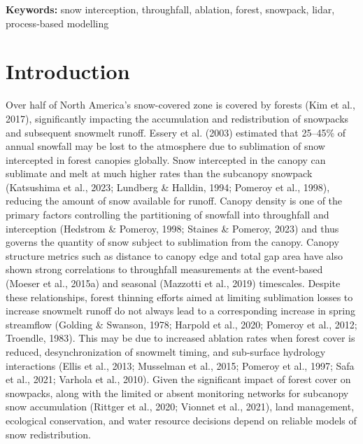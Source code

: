 \documentclass[
  letterpaper,
  DIV=11,
  numbers=noendperiod]{scrartcl}
\begin{document}
\textbf{Keywords:} snow interception, throughfall, ablation, forest,
snowpack, lidar, process-based modelling

\section{Introduction}\label{introduction}

Over half of North America's snow-covered zone is covered by forests
(Kim et al., 2017), significantly impacting the accumulation and
redistribution of snowpacks and subsequent snowmelt runoff. Essery et
al. (2003) estimated that 25--45\% of annual snowfall may be lost to the
atmosphere due to sublimation of snow intercepted in forest canopies
globally. Snow intercepted in the canopy can sublimate and melt at much
higher rates than the subcanopy snowpack (Katsushima et al., 2023;
Lundberg \& Halldin, 1994; Pomeroy et al., 1998), reducing the amount of
snow available for runoff. Canopy density is one of the primary factors
controlling the partitioning of snowfall into throughfall and
interception (Hedstrom \& Pomeroy, 1998; Staines \& Pomeroy, 2023) and
thus governs the quantity of snow subject to sublimation from the
canopy. Canopy structure metrics such as distance to canopy edge and
total gap area have also shown strong correlations to throughfall
measurements at the event-based (Moeser et al., 2015a) and seasonal
(Mazzotti et al., 2019) timescales. Despite these relationships, forest
thinning efforts aimed at limiting sublimation losses to increase
snowmelt runoff do not always lead to a corresponding increase in spring
streamflow (Golding \& Swanson, 1978; Harpold et al., 2020; Pomeroy et
al., 2012; Troendle, 1983). This may be due to increased ablation rates
when forest cover is reduced, desynchronization of snowmelt timing, and
sub-surface hydrology interactions (Ellis et al., 2013; Musselman et
al., 2015; Pomeroy et al., 1997; Safa et al., 2021; Varhola et al.,
2010). Given the significant impact of forest cover on snowpacks, along
with the limited or absent monitoring networks for subcanopy snow
accumulation (Rittger et al., 2020; Vionnet et al., 2021), land
management, ecological conservation, and water resource decisions depend
on reliable models of snow redistribution.
\end{document}
